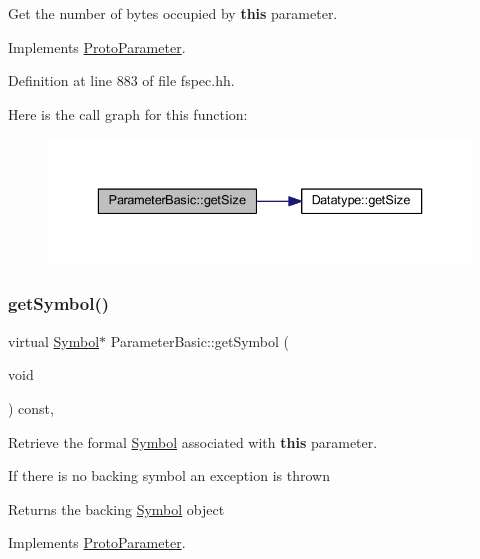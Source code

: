 Get the number of bytes occupied by {\bfseries{this}} parameter. 



Implements \mbox{\hyperlink{class_proto_parameter_a910cfb9ed6ce57e9bf6e9789b8ed3e0f}{Proto\+Parameter}}.



Definition at line 883 of file fspec.\+hh.

Here is the call graph for this function\+:
\nopagebreak
\begin{figure}[H]
\begin{center}
\leavevmode
\includegraphics[width=336pt]{class_parameter_basic_a96b3cef1901c8f4b7591551ea7b4d407_cgraph}
\end{center}
\end{figure}
\mbox{\label{class_parameter_basic_ae3b74f1e127c354b6baabf69d2f36056}} 
\subsubsection{\texorpdfstring{getSymbol()}{getSymbol()}}
{\footnotesize\ttfamily virtual \mbox{\hyperlink{class_symbol}{Symbol}}$\ast$ Parameter\+Basic\+::get\+Symbol (\begin{DoxyParamCaption}\item[{void}]{ }\end{DoxyParamCaption}) const\hspace{0.3cm}{\ttfamily [inline]}, {\ttfamily [virtual]}}



Retrieve the formal \mbox{\hyperlink{class_symbol}{Symbol}} associated with {\bfseries{this}} parameter. 

If there is no backing symbol an exception is thrown \begin{DoxyReturn}{Returns}
the backing \mbox{\hyperlink{class_symbol}{Symbol}} object 
\end{DoxyReturn}


Implements \mbox{\hyperlink{class_proto_parameter_afb4a7192eb2e8449b47d85073b3d82e6}{Proto\+Parameter}}.



